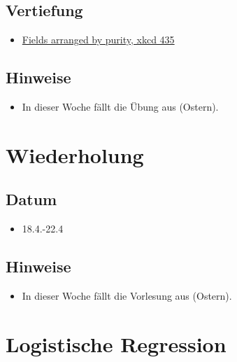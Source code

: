 \documentclass[
]{book}
\providecommand{\tightlist}{%
  \setlength{\itemsep}{0pt}\setlength{\parskip}{0pt}}
\begin{document}
\hypertarget{vertiefung-1}{%
\subsection{Vertiefung}\label{vertiefung-1}}

\begin{itemize}
\tightlist
\item
  \href{https://xkcd.com/435/}{Fields arranged by purity, xkcd 435}
\end{itemize}

\hypertarget{hinweise-1}{%
\subsection{Hinweise}\label{hinweise-1}}

\begin{itemize}
\tightlist
\item
  In dieser Woche fällt die Übung aus (Ostern).
\end{itemize}

\hypertarget{wiederholung}{%
\section{Wiederholung}\label{wiederholung}}

\hypertarget{datum-5}{%
\subsection{Datum}\label{datum-5}}

\begin{itemize}
\tightlist
\item
  18.4.-22.4
\end{itemize}

\hypertarget{hinweise-2}{%
\subsection{Hinweise}\label{hinweise-2}}

\begin{itemize}
\tightlist
\item
  In dieser Woche fällt die Vorlesung aus (Ostern).
\end{itemize}

\hypertarget{logistische-regression}{%
\section{Logistische Regression}\label{logistische-regression}}
\end{document}
